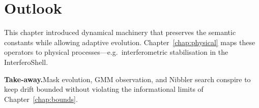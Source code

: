 \section{Outlook}
This chapter introduced dynamical machinery that preserves the semantic constants while
allowing adaptive evolution.  Chapter~\ref{chap:physical} maps these operators to
physical processes—e.g.\, interferometric stabilisation in the InterferoShell.

\bigskip\noindent\textbf{Take‑away.}\;Mask evolution, GMM observation, and Nibbler search
conspire to keep drift bounded without violating the informational limits of
Chapter~\ref{chap:bounds}.

\clearpage

